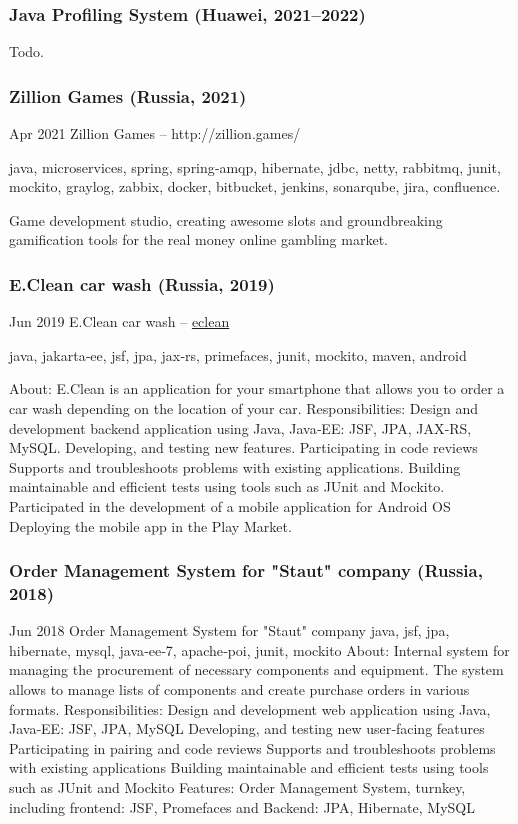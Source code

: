 \documentclass{vl}
\begin{document}
    \subsubsection*{Java Profiling System (Huawei, 2021--2022)}

    Todo.

    \subsubsection*{Zillion Games (Russia, 2021)}

    Apr 2021 Zillion Games – http://zillion.games/

    java, microservices, spring, spring‐amqp, hibernate, jdbc, netty, rabbitmq, junit, mockito, graylog, zabbix, docker,
    bitbucket, jenkins, sonarqube, jira, confluence.

    Game development studio, creating awesome slots and groundbreaking gamification tools for the real money online
    gambling market.

    \subsubsection*{E.Clean car wash (Russia, 2019)}
    Jun 2019 E.Clean car wash – \href{https://play.google.com/store/apps/details?id=com.altinntech.eclean}{eclean}

    java, jakarta‐ee, jsf, jpa, jax‐rs, primefaces, junit, mockito, maven, android

    About: E.Clean is an application for your smartphone that allows you to order a car wash depending on the location
    of your car.
    Responsibilities: Design and development backend application using Java, Java‐EE: JSF, JPA, JAX‐RS, MySQL.
    Developing, and testing new features. Participating in code reviews Supports and troubleshoots problems with
    existing applications. Building maintainable and efficient tests using tools such as JUnit and Mockito.
    Participated in the development of a mobile application for Android OS Deploying the mobile app in the Play Market.

    \subsubsection*{Order Management System for "Staut" company (Russia, 2018)}
    Jun 2018 Order Management System for "Staut" company
    java, jsf, jpa, hibernate, mysql, java‐ee‐7, apache‐poi, junit, mockito
    About: Internal system for managing the procurement of necessary components and equipment. The system allows to
    manage lists of components and create purchase orders in various formats.
    Responsibilities:
    Design and development web application using Java, Java‐EE: JSF, JPA, MySQL
    Developing, and testing new user‐facing features
    Participating in pairing and code reviews
    Supports and troubleshoots problems with existing applications
    Building maintainable and efficient tests using tools such as JUnit and Mockito
    Features:
    Order Management System, turnkey, including frontend: JSF, Promefaces and Backend: JPA, Hibernate, MySQL
\end{document}
